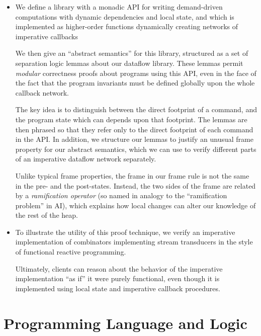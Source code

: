 \documentclass[preprint,natbib]{sigplanconf}
\begin{document}
\begin{itemize}
  \item We define a library with a monadic API for writing
    demand-driven computations with dynamic dependencies and local
    state, and which is implemented as higher-order functions
    dynamically creating networks of imperative callbacks

    We then give an ``abstract semantics'' for this
    library, structured as a set of separation logic lemmas about our
    dataflow library. These lemmas permit \emph{modular} correctness
    proofs about programs using this API, even in the face of the fact
    that the program invariants must be defined globally upon the
    whole callback network.

    The key idea is to distinguish between the direct footprint of a
    command, and the program state which can depends upon that
    footprint. The lemmas are then phrased so that they refer only to
    the direct footprint of each command in the API. In addition, we
    structure our lemmas to justify an unusual frame property for our
    abstract semantics, which we can use to verify different parts of
    an imperative dataflow network separately.

    Unlike typical frame properties, the frame in our frame rule is
    not the same in the pre- and the post-states. Instead, the two
    sides of the frame are related by a \emph{ramification operator}
    (so named in analogy to the ``ramification problem'' in AI), which
    explains how local changes can alter our knowledge of the rest of
    the heap.

  \item To illustrate the utility of this proof technique, we verify
    an imperative implementation of combinators implementing stream
    transducers in the style of functional reactive programming. 

    Ultimately, clients can reason about the behavior of the imperative
    implementation ``as if'' it were purely functional, even though it
    is implemented using local state and imperative callback
    procedures.
\end{itemize}

\section{Programming Language and Logic}
\end{document}
